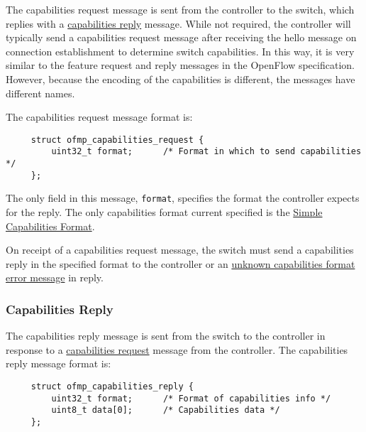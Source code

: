 \documentclass[11pt,a4paper]{article}
\begin{document}
     The capabilities request message is sent from the controller to
     the switch, which replies with a \hyperref[sec-2.8.3]{capabilities reply} message.
     While not required, the controller will typically send a
     capabilities request message after receiving the hello message on
     connection establishment to determine switch capabilities.  In
     this way, it is very similar to the feature request and reply
     messages in the OpenFlow specification.  However, because the
     encoding of the capabilities is different, the messages have
     different names.

     The capabilities request message format is:

{ \footnotesize

\begin{verbatim}
     struct ofmp_capabilities_request {
         uint32_t format;      /* Format in which to send capabilities */
     };

\end{verbatim}


}

     The only field in this message, \verb|format|, specifies the format
     the controller expects for the reply.  The only capabilities
     format current specified is the \hyperref[*==Simple==Capabilities==Format]{Simple Capabilities Format}.

     On receipt of a capabilities request message, the switch must
     send a capabilities reply in the specified format to the
     controller or an \hyperref[*==Unknown==capabilities==format]{unknown capabilities format error message} in
     reply.

\subsubsection{Capabilities Reply}
\label{sec-2.8.3}


     The capabilities reply message is sent from the switch to the
     controller in response to a \hyperref[sec-2.8.2]{capabilities request} message from the
     controller.  The capabilities reply message format is:

{ \footnotesize

\begin{verbatim}
     struct ofmp_capabilities_reply {
         uint32_t format;      /* Format of capabilities info */
         uint8_t data[0];      /* Capabilities data */
     };

\end{verbatim}


}
\end{document}

